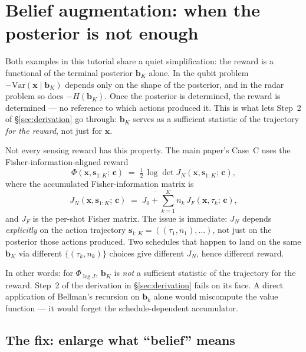 \documentclass[11pt]{article}
\newcommand{\bc}{\bm{c}}
\newcommand{\bx}{\bm{x}}
\newcommand{\bs}{\bm{s}}
\newcommand{\bb}{\bm{b}}
\begin{document}
\section{Belief augmentation: when the posterior is not enough}
\label{sec:augmentation}

Both examples in this tutorial share a quiet simplification: the reward is a functional of the terminal posterior $\bb_K$ alone.  In the qubit problem $-\mathrm{Var}(\bx \mid \bb_K)$ depends only on the shape of the posterior, and in the radar problem so does $-H(\bb_K)$.  Once the posterior is determined, the reward is determined --- no reference to which actions produced it.  This is what lets Step~2 of §\ref{sec:derivation} go through: $\bb_K$ serves as a sufficient statistic of the trajectory \emph{for the reward}, not just for $\bx$.

Not every sensing reward has this property.  The main paper's Case~C uses the Fisher-information-aligned reward
\begin{equation}
\Phi(\bx, \bs_{1:K};\, \bc) \;=\; \tfrac{1}{2}\, \log \det J_N(\bx, \bs_{1:K};\, \bc),
\label{eq:phi_logJ_tutorial}
\end{equation}
where the accumulated Fisher-information matrix is
\begin{equation}
J_N(\bx, \bs_{1:K};\, \bc) \;=\; J_0 + \sum_{k=1}^K n_k\, J_F(\bx, \tau_k;\, \bc),
\end{equation}
and $J_F$ is the per-shot Fisher matrix.  The issue is immediate: $J_N$ depends \emph{explicitly} on the action trajectory $\bs_{1:K} = ((\tau_1, n_1), \ldots)$, not just on the posterior those actions produced.  Two schedules that happen to land on the same $\bb_K$ via different $\{(\tau_k, n_k)\}$ choices give different $J_N$, hence different reward.

In other words: for $\Phi_{\log J}$, $\bb_K$ is \emph{not} a sufficient statistic of the trajectory for the reward.  Step~2 of the derivation in §\ref{sec:derivation} fails on its face.  A direct application of Bellman's recursion on $\bb_k$ alone would miscompute the value function --- it would forget the schedule-dependent accumulator.

\subsection{The fix: enlarge what ``belief'' means}
\end{document}
